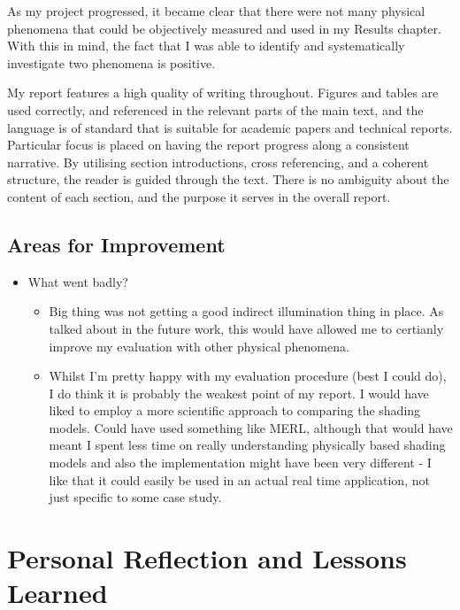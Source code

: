 \begin{appendices}
As my project progressed, it became clear that there were not many physical phenomena that could be objectively measured and used in my Results chapter. With this in mind, the fact that I was able to identify and systematically investigate two phenomena is positive.

My report features a high quality of writing throughout. Figures and tables are used correctly, and referenced in the relevant parts of the main text, and the language is of standard that is suitable for academic papers and technical reports. Particular focus is placed on having the report progress along a consistent narrative. By utilising section introductions, cross referencing, and a coherent structure, the reader is guided through the text. There is no ambiguity about the content of each section, and the purpose it serves in the overall report.

\subsection{Areas for Improvement}

\begin{itemize}
	\item What went badly?
	\begin{itemize}
		\item Big thing was not getting a good indirect illumination thing in place. As talked about in the future work, this would have allowed me to certianly improve my evaluation with other physical phenomena.
		\item Whilst I'm pretty happy with my evaluation procedure (best I could do), I do think it is probably the weakest point of my report. I would have liked to employ a more scientific approach to comparing the shading models. Could have used something like MERL, although that would have meant I spent less time on really understanding physically based shading models and also the implementation might have been very different - I like that it could easily be used in an actual real time application, not just specific to some case study.
	\end{itemize}
\end{itemize}

\section{Personal Reflection and Lessons Learned}


\end{appendices}
